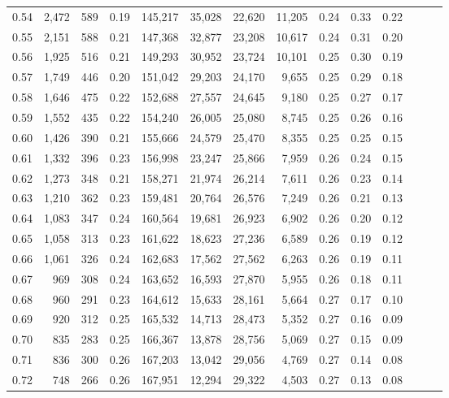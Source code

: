 \begin{tabular}{rrrrrrrrrrrrrr}
0.54 &  2,472 &  589 &  0.19 &  145,217 &   35,028 &  22,620 &  11,205 &  0.24 &  0.33 &      0.22 \\
0.55 &  2,151 &  588 &  0.21 &  147,368 &   32,877 &  23,208 &  10,617 &  0.24 &  0.31 &      0.20 \\
0.56 &  1,925 &  516 &  0.21 &  149,293 &   30,952 &  23,724 &  10,101 &  0.25 &  0.30 &      0.19 \\
0.57 &  1,749 &  446 &  0.20 &  151,042 &   29,203 &  24,170 &   9,655 &  0.25 &  0.29 &      0.18 \\
0.58 &  1,646 &  475 &  0.22 &  152,688 &   27,557 &  24,645 &   9,180 &  0.25 &  0.27 &      0.17 \\
0.59 &  1,552 &  435 &  0.22 &  154,240 &   26,005 &  25,080 &   8,745 &  0.25 &  0.26 &      0.16 \\
0.60 &  1,426 &  390 &  0.21 &  155,666 &   24,579 &  25,470 &   8,355 &  0.25 &  0.25 &      0.15 \\
0.61 &  1,332 &  396 &  0.23 &  156,998 &   23,247 &  25,866 &   7,959 &  0.26 &  0.24 &      0.15 \\
0.62 &  1,273 &  348 &  0.21 &  158,271 &   21,974 &  26,214 &   7,611 &  0.26 &  0.23 &      0.14 \\
0.63 &  1,210 &  362 &  0.23 &  159,481 &   20,764 &  26,576 &   7,249 &  0.26 &  0.21 &      0.13 \\
0.64 &  1,083 &  347 &  0.24 &  160,564 &   19,681 &  26,923 &   6,902 &  0.26 &  0.20 &      0.12 \\
0.65 &  1,058 &  313 &  0.23 &  161,622 &   18,623 &  27,236 &   6,589 &  0.26 &  0.19 &      0.12 \\
0.66 &  1,061 &  326 &  0.24 &  162,683 &   17,562 &  27,562 &   6,263 &  0.26 &  0.19 &      0.11 \\
0.67 &    969 &  308 &  0.24 &  163,652 &   16,593 &  27,870 &   5,955 &  0.26 &  0.18 &      0.11 \\
0.68 &    960 &  291 &  0.23 &  164,612 &   15,633 &  28,161 &   5,664 &  0.27 &  0.17 &      0.10 \\
0.69 &    920 &  312 &  0.25 &  165,532 &   14,713 &  28,473 &   5,352 &  0.27 &  0.16 &      0.09 \\
0.70 &    835 &  283 &  0.25 &  166,367 &   13,878 &  28,756 &   5,069 &  0.27 &  0.15 &      0.09 \\
0.71 &    836 &  300 &  0.26 &  167,203 &   13,042 &  29,056 &   4,769 &  0.27 &  0.14 &      0.08 \\
0.72 &    748 &  266 &  0.26 &  167,951 &   12,294 &  29,322 &   4,503 &  0.27 &  0.13 &      0.08 \\

\end{tabular}
